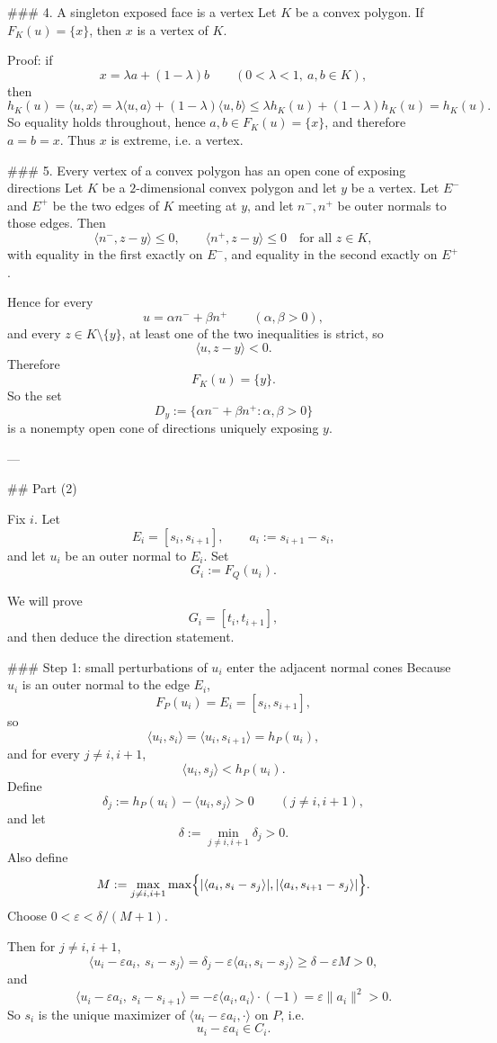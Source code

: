 ### 4. A singleton exposed face is a vertex
Let \(K\) be a convex polygon. If \(F_K(u)=\{x\}\), then \(x\) is a vertex of \(K\).

Proof: if
\[
x=\lambda a+(1-\lambda)b
\qquad
(0<\lambda<1,\ a,b\in K),
\]
then
\[
h_K(u)=\langle u,x\rangle
=\lambda \langle u,a\rangle+(1-\lambda)\langle u,b\rangle
\le \lambda h_K(u)+(1-\lambda)h_K(u)=h_K(u).
\]
So equality holds throughout, hence \(a,b\in F_K(u)=\{x\}\), and therefore \(a=b=x\). Thus \(x\) is extreme, i.e. a vertex.

### 5. Every vertex of a convex polygon has an open cone of exposing directions
Let \(K\) be a \(2\)-dimensional convex polygon and let \(y\) be a vertex. Let \(E^-\) and \(E^+\) be the two edges of \(K\) meeting at \(y\), and let \(n^-,n^+\) be outer normals to those edges. Then
\[
\langle n^-,z-y\rangle\le 0,\qquad \langle n^+,z-y\rangle\le 0
\quad\text{for all }z\in K,
\]
with equality in the first exactly on \(E^-\), and equality in the second exactly on \(E^+\).

Hence for every
\[
u=\alpha n^-+\beta n^+ \qquad (\alpha,\beta>0),
\]
and every \(z\in K\setminus\{y\}\), at least one of the two inequalities is strict, so
\[
\langle u,z-y\rangle<0.
\]
Therefore
\[
F_K(u)=\{y\}.
\]
So the set
\[
D_y:=\{\alpha n^-+\beta n^+:\alpha,\beta>0\}
\]
is a nonempty open cone of directions uniquely exposing \(y\).

---

## Part (2)

Fix \(i\). Let
\[
E_i=[s_i,s_{i+1}],\qquad a_i:=s_{i+1}-s_i,
\]
and let \(u_i\) be an outer normal to \(E_i\). Set
\[
G_i:=F_Q(u_i).
\]

We will prove
\[
G_i=[t_i,t_{i+1}],
\]
and then deduce the direction statement.

### Step 1: small perturbations of \(u_i\) enter the adjacent normal cones
Because \(u_i\) is an outer normal to the edge \(E_i\),
\[
F_P(u_i)=E_i=[s_i,s_{i+1}],
\]
so
\[
\langle u_i,s_i\rangle=\langle u_i,s_{i+1}\rangle=h_P(u_i),
\]
and for every \(j\neq i,i+1\),
\[
\langle u_i,s_j\rangle<h_P(u_i).
\]
Define
\[
\delta_j:=h_P(u_i)-\langle u_i,s_j\rangle>0
\qquad (j\neq i,i+1),
\]
and let
\[
\delta:=\min_{j\neq i,i+1}\delta_j>0.
\]
Also define
\[
M:=\max_{j\neq i,i+1}
\max\Bigl\{
|\langle a_i,s_i-s_j\rangle|,
|\langle a_i,s_{i+1}-s_j\rangle|
\Bigr\}.
\]
Choose \(0<\varepsilon<\delta/(M+1)\).

Then for \(j\neq i,i+1\),
\[
\langle u_i-\varepsilon a_i,\ s_i-s_j\rangle
=
\delta_j-\varepsilon\langle a_i,s_i-s_j\rangle
\ge \delta-\varepsilon M>0,
\]
and
\[
\langle u_i-\varepsilon a_i,\ s_i-s_{i+1}\rangle
=
-\varepsilon\langle a_i,a_i\rangle
\cdot(-1)
=
\varepsilon\|a_i\|^2>0.
\]
So \(s_i\) is the unique maximizer of \(\langle u_i-\varepsilon a_i,\cdot\rangle\) on \(P\), i.e.
\[
u_i-\varepsilon a_i\in C_i.
\]

